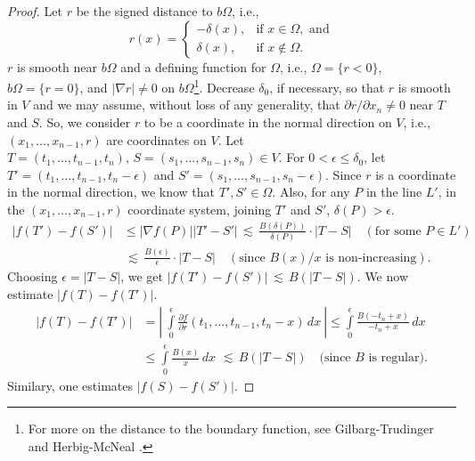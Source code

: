 \documentclass[12pt,a4paper]{amsart}
\numberwithin{equation}{section}
\theoremstyle{definition}
\begin{document}
\begin{proof}
Let $r$ be the signed distance to $b\Omega$, i.e.,
\[r(x) = \begin{cases}
-\delta(x), & \text{if } x\in\Omega, \text{ and}\\
\delta(x), & \text{if } x\notin\Omega.
\end{cases}\]
$r$ is smooth near $b\Omega$ and a defining function for $\Omega$, i.e., $\Omega = \{r<0\}$, $b\Omega = \{ r=0 \}$, and ${\left\lvert{\nabla r}\right\rvert}\ne 0$ on $b\Omega$\footnote{For more on the distance to the boundary 
function, see Gilbarg-Trudinger \cite[pp.~354-357]{Gil-Tru83} and Herbig-McNeal \cite{Her-McN10}.}. Decrease $\delta_0$, if necessary, so that $r$ is smooth in $V$ and we may assume, without loss of any 
generality, that $\partial r/\partial x_n \neq 0$ near $T$ and $S$. So, we consider $r$ to be a coordinate in the normal direction on $V$, i.e., $(x_1,\ldots,x_{n-1},r)$ are coordinates on $V$. Let $T=(t_1,
\ldots,t_{n-1},t_n),\, S=(s_1,\ldots, s_{n-1}, s_n) \in V$. For $0<\epsilon \le \delta_0$, let $T'=(t_1,\ldots,t_{n-1},t_n-\epsilon)$ and  $S'=(s_1,\ldots,s_{n-1},{s_n-\epsilon})$. Since $r$ is a coordinate in the normal 
direction, we know that $T', S' \in \Omega$. Also, for any $P$ in the line $L'$, in the $(x_1,\ldots,x_{n-1},r)$ coordinate system, joining $T'$ and $S'$,  $\delta(P) > \epsilon$.
\begin{align*}
{\left\lvert{f(T')-f(S')}\right\rvert} &\le {\left\lvert{\nabla f(P)}\right\rvert}{\left\lvert{T'-S'}\right\rvert}  \, \lesssim\,  \frac{B\left(\delta(P)\right)}{\delta(P)}\cdot {\left\lvert{T-S}\right\rvert}\quad (\text{for some }P \in L')\\
&\, \lesssim\, \frac{B(\epsilon)}{\epsilon} \cdot {\left\lvert{T-S}\right\rvert}\quad (\text{since } B(x)/x \text{ is non-increasing}).
\end{align*}
Choosing $\epsilon={\left\lvert{T-S}\right\rvert}$, we get ${\left\lvert{f(T')-f(S')}\right\rvert} \,\lesssim\, B({\left\lvert{T-S}\right\rvert})$. We now estimate ${\left\lvert{f(T)-f(T')}\right\rvert}$.
\begin{align*}
{\left\lvert{f(T)-f(T')}\right\rvert} &= {\left\lvert{\ \int\limits_0^{\epsilon} \frac{\partial f}{\partial r}(t_1,\ldots,t_{n-1},t_n-x)\, dx\ }\right\rvert} \le \int\limits_0^{\epsilon} \frac{B(-t_n+x)}{-t_n+x}\, dx \\
&\le \int\limits_0^{\epsilon} \frac{B(x)}{x}\, dx\,\, \lesssim\, B({\left\lvert{T-S}\right\rvert}) \quad\text{(since $B$ is regular)}.
\end{align*}
Similary, one estimates ${\left\lvert{f(S)-f(S')}\right\rvert}$.
\end{proof}
\end{document}
